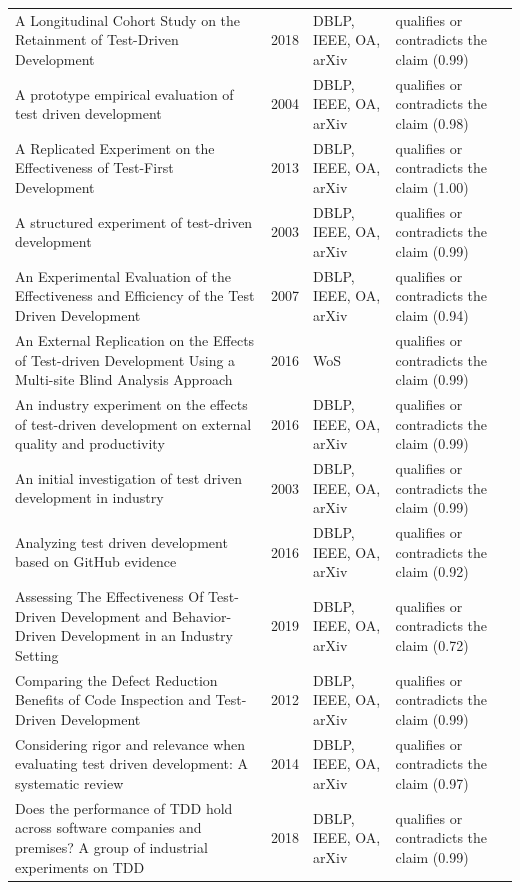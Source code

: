 \begin{longtable}{@{}%
  >{\raggedright\arraybackslash}p{}c%
  >{\raggedright\arraybackslash}p{}%
  >{\raggedright\arraybackslash}p{}@{}}
A Longitudinal Cohort Study on the Retainment of Test-Driven Development & 2018 & DBLP, IEEE, OA, arXiv & qualifies or contradicts the claim (0.99) \\
A prototype empirical evaluation of test driven development & 2004 & DBLP, IEEE, OA, arXiv & qualifies or contradicts the claim (0.98) \\
A Replicated Experiment on the Effectiveness of Test-First Development & 2013 & DBLP, IEEE, OA, arXiv & qualifies or contradicts the claim (1.00) \\
A structured experiment of test-driven development & 2003 & DBLP, IEEE, OA, arXiv & qualifies or contradicts the claim (0.99) \\
An Experimental Evaluation of the Effectiveness and Efficiency of the Test Driven Development & 2007 & DBLP, IEEE, OA, arXiv & qualifies or contradicts the claim (0.94) \\
An External Replication on the Effects of Test-driven Development Using a Multi-site Blind Analysis Approach & 2016 & WoS & qualifies or contradicts the claim (0.99) \\
An industry experiment on the effects of test-driven development on external quality and productivity & 2016 & DBLP, IEEE, OA, arXiv & qualifies or contradicts the claim (0.99) \\
An initial investigation of test driven development in industry & 2003 & DBLP, IEEE, OA, arXiv & qualifies or contradicts the claim (0.99) \\
Analyzing test driven development based on GitHub evidence & 2016 & DBLP, IEEE, OA, arXiv & qualifies or contradicts the claim (0.92) \\
Assessing The Effectiveness Of Test-Driven Development and Behavior-Driven Development in an Industry Setting & 2019 & DBLP, IEEE, OA, arXiv & qualifies or contradicts the claim (0.72) \\
Comparing the Defect Reduction Benefits of Code Inspection and Test-Driven Development & 2012 & DBLP, IEEE, OA, arXiv & qualifies or contradicts the claim (0.99) \\
Considering rigor and relevance when evaluating test driven development: A systematic review & 2014 & DBLP, IEEE, OA, arXiv & qualifies or contradicts the claim (0.97) \\
Does the performance of TDD hold across software companies and premises? A group of industrial experiments on TDD & 2018 & DBLP, IEEE, OA, arXiv & qualifies or contradicts the claim (0.99) \\

\end{longtable}
